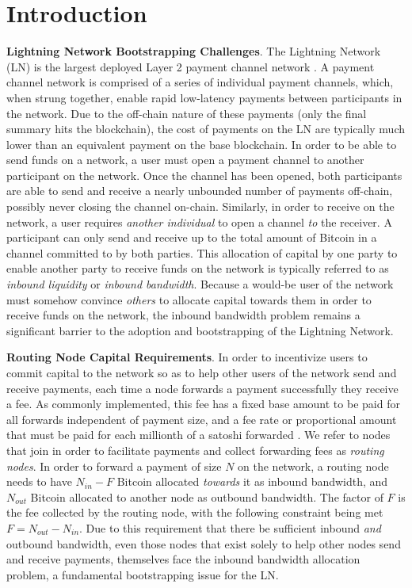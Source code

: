 \documentclass[10pt,a4paper]{article}
\theoremstyle{definition}
\begin{document}
\vfill

\section{Introduction}

\textbf{Lightning Network Bootstrapping Challenges}. The Lightning Network (LN)
is the largest deployed Layer 2 payment channel network \cite{lnpaper}.  A
payment channel network is comprised of a series of individual payment
channels, which, when strung together, enable rapid low-latency payments
between participants in the network. Due to the off-chain nature of these
payments (only the final summary hits the blockchain), the cost of payments on
the LN are typically much lower than an equivalent payment on the base
blockchain. In order to be able to send funds on a network, a user must open a
payment channel to another participant on the network. Once the channel has
been opened, both participants are able to send and receive a nearly unbounded
number of payments off-chain, possibly never closing the channel on-chain.
Similarly, in order to receive on the network, a user requires \emph{another
individual} to open a channel \emph{to} the receiver. A participant can only
send and receive up to the total amount of Bitcoin in a channel committed to by
both parties. This allocation of capital by one party to enable another party
to receive funds on the network is typically referred to as \emph{inbound
liquidity} or \emph{inbound bandwidth}.  Because a would-be user of the network
must somehow convince \emph{others} to allocate capital towards them in order
to receive funds on the network, the inbound bandwidth problem remains a
significant barrier to the adoption and bootstrapping of the Lightning Network.

\textbf{Routing Node Capital Requirements}.  In order to incentivize users to
commit capital to the network so as to help other users of the network send and
receive payments, each time a node forwards a payment successfully they receive
a fee. As commonly implemented, this fee has a fixed base amount to be paid for
all forwards independent of payment size, and a fee rate or proportional amount
that must be paid for each millionth of a satoshi forwarded \cite{bolt7}. We
refer to nodes that join in order to facilitate payments and collect forwarding
fees as \emph{routing nodes}. In order to forward a payment of size $N$ on the
network, a routing node needs to have $N_{in} - F$ Bitcoin allocated
\emph{towards} it as inbound bandwidth, and $N_{out}$ Bitcoin allocated to
another node as outbound bandwidth. The factor of $F$ is the fee collected by
the routing node, with the following constraint being met $F = N_{out} -
N_{in}$. Due to this requirement that there be sufficient inbound \emph{and}
outbound bandwidth, even those nodes that exist solely to help other nodes send
and receive payments, themselves face the inbound bandwidth allocation problem,
a fundamental bootstrapping issue for the LN.
\end{document}
